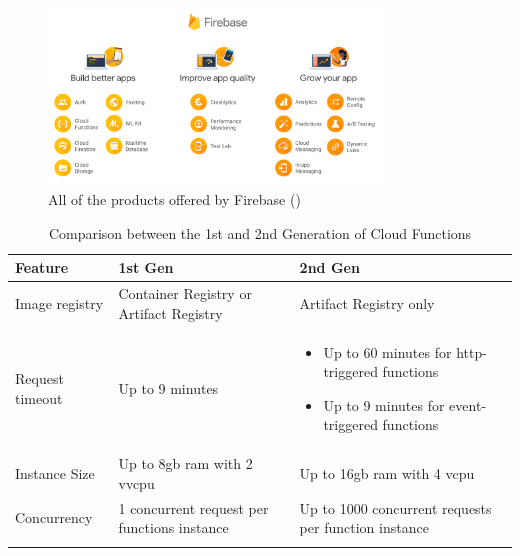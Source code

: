 \begin{figure}[htbp]
      \centering
      \includegraphics[width=0.8\textwidth]{Figures/Firebase.png}
      \caption{All of the products offered by Firebase (\textit{\cite{firebasePic}})}
\end{figure}

\begin{longtable}{|p{5cm}|p{5.5cm}|p{5.5cm}|}
      \hline
      \rowcolor{blue!20}
      Feature         & 1st Gen                                                     & 2nd Gen                                                       \\
      \endfirsthead
      \hline
      Image registry  & Container Registry or Artifact Registry                     & Artifact Registry only                                        \\
      \hline
      Request timeout & Up to 9 minutes                                             & \begin{itemize}
                                                                                            \item Up to 60 minutes for \acrshort{http}-triggered functions
                                                                                            \item Up to 9 minutes for event-triggered functions
                                                                                      \end{itemize} \\
      \hline
      Instance Size   & Up to 8\acrshort{gb} \acrshort{ram} with 2 v\acrshort{vcpu} & Up to 16\acrshort{gb} \acrshort{ram} with 4 \acrshort{vcpu}   \\
      \hline
      Concurrency     & 1 concurrent request per functions instance                 & Up to 1000 concurrent requests per function instance          \\
      \hline
      \caption{Comparison between the 1st and 2nd Generation of Cloud Functions}
      \label{tab:restvsoap}
\end{longtable}

